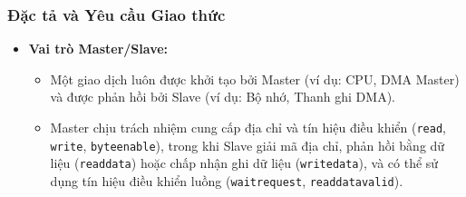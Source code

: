 \subsubsection{Đặc tả và Yêu cầu Giao thức}
\begin{itemize}
    \item \textbf{Vai trò Master/Slave:} 
    \begin{itemize}
        \item Một giao dịch luôn được khởi tạo bởi Master (ví dụ: CPU, DMA Master) và được phản hồi bởi Slave (ví dụ: Bộ nhớ, Thanh ghi DMA).
        \item Master chịu trách nhiệm cung cấp địa chỉ và tín hiệu điều khiển (\texttt{read}, \texttt{write}, \texttt{byteenable}), trong khi Slave giải mã địa chỉ, phản hồi bằng dữ liệu (\texttt{readdata}) hoặc chấp nhận ghi dữ liệu (\texttt{writedata}), và có thể sử dụng tín hiệu điều khiển luồng (\texttt{waitrequest}, \texttt{readdatavalid}).
    \end{itemize} 


\end{itemize}
